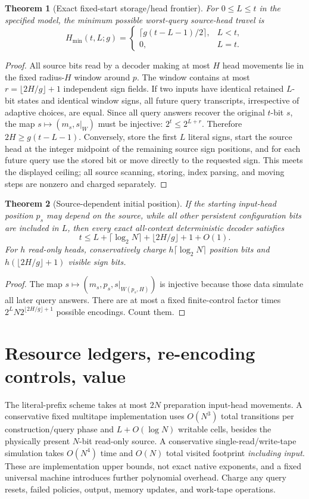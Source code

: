 \documentclass[11pt]{article}
\newtheorem{theorem}{Theorem}
\begin{document}
\begin{theorem}[Exact fixed-start storage/head frontier]
For $0\le L\le t$ in the specified model, the minimum possible worst-query source-head travel is
\[
\boxed{H_{\min}(t,L;g)=
\begin{cases}
\lceil g(t-L-1)/2\rceil,&L<t,\\0,&L=t.
\end{cases}}
\]
\end{theorem}
\begin{proof}
All source bits read by a decoder making at most $H$ head movements lie in the fixed radius-$H$ window around $p$. The window contains at most $r=\lfloor2H/g\rfloor+1$ independent sign fields. If two inputs have identical retained $L$-bit states and identical window signs, all future query transcripts, irrespective of adaptive choices, are equal. Since all query answers recover the original $t$-bit $s$, the map $s\mapsto(m_s,s|_W)$ must be injective: $2^t\le2^{L+r}$. Therefore $2H\ge g(t-L-1)$. Conversely, store the first $L$ literal signs, start the source head at the integer midpoint of the remaining source sign positions, and for each future query use the stored bit or move directly to the requested sign. This meets the displayed ceiling; all source scanning, storing, index parsing, and moving steps are nonzero and charged separately.
\end{proof}

\begin{theorem}[Source-dependent initial position]
If the starting input-head position $p_s$ may depend on the source, while all other persistent configuration bits are included in $L$, then every exact all-context deterministic decoder satisfies
\[
\boxed{t\le L+\lceil\log_2 N\rceil+
\lfloor2H/g\rfloor+1+O(1).}
\]
For $h$ read-only heads, conservatively charge $h\lceil\log_2N\rceil$ position bits and $h(\lfloor2H/g\rfloor+1)$ visible sign bits.
\end{theorem}
\begin{proof}
The map $s\mapsto(m_s,p_s,s|_{W(p_s,H)})$ is injective because those data simulate all later query answers. There are at most a fixed finite-control factor times $2^L N2^{\lfloor2H/g\rfloor+1}$ possible encodings. Count them.
\end{proof}

\section{Resource ledgers, re-encoding controls, value}
The literal-prefix scheme takes at most $2N$ preparation input-head movements. A conservative fixed multitape implementation uses $O(N^3)$ total transitions per construction/query phase and $L+O(\log N)$ writable cells, besides the physically present $N$-bit read-only source. A conservative single-read/write-tape simulation takes $O(N^4)$ time and $O(N)$ total visited footprint \emph{including input}. These are implementation upper bounds, not exact native exponents, and a fixed universal machine introduces further polynomial overhead. Charge any query resets, failed policies, output, memory updates, and work-tape operations.
\end{document}
